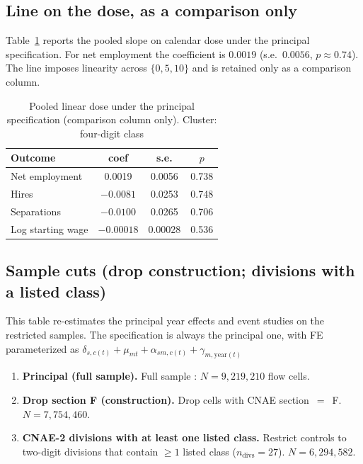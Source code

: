 \documentclass[12pt,a4paper]{article}
\begin{document}
\subsection{Line on the dose, as a comparison only}

Table~\ref{tab:reta} reports the pooled slope on calendar dose under the principal specification.
For net employment the coefficient is $0.0019$ (s.e.\ $0.0056$, $p\approx 0.74$). The line imposes linearity across $\{0,5,10\}$ and is retained only as a comparison column.

\begin{table}[H]
\centering
\caption{Pooled linear dose under the principal specification (comparison column only).
Cluster: four-digit class}
\label{tab:reta}
\begin{tabular}{lccc}
\toprule
Outcome & coef & s.e. & $p$ \\
\midrule
Net employment & 0.0019 & 0.0056 & 0.738 \\
Hires  & $-0.0081$ & 0.0253 & 0.748 \\
Separations  & $-0.0100$ & 0.0265 & 0.706 \\
Log starting wage & $-0.00018$ & 0.00028 & 0.536 \\
\bottomrule
\end{tabular}
\end{table}

\subsection{Sample cuts (drop construction; divisions with a listed class)}
\label{sec:rob_samples}

This table re-estimates the principal year effects and event studies on the restricted samples. The specification is always the principal one, with FE parameterized as $\delta_{s,c(t)} + \mu_{mt} + \alpha_{sm,c(t)} + \gamma_{m, \text{year}(t)}$ 

\begin{enumerate}[nosep]
  \item \textbf{Principal (full sample).} Full sample : $N=9{,}219{,}210$ flow cells.
  \item \textbf{Drop section F (construction).} Drop cells with CNAE section~$=$~F. $N=7{,}754{,}460$.
  \item \textbf{CNAE-2 divisions with at least one listed class.} Restrict controls to two-digit divisions that contain $\geq 1$ listed class ($n_{\mathrm{divs}}=27$). $N=6{,}294{,}582$.
\end{enumerate}
\end{document}
